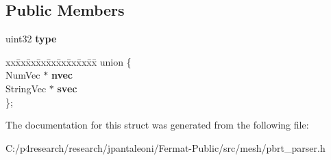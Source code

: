 \subsection*{Public Members}
\begin{DoxyCompactItemize}
\item 
\mbox{\label{structpbrt_1_1_value_a2de3a97f80c479e31993d4dcb1377626}} 
uint32 {\bfseries type}
\item 
\mbox{\label{structpbrt_1_1_value_ab3dc6cf58a952dce1cffb107c12a0e32}} 
\begin{tabbing}
xx\=xx\=xx\=xx\=xx\=xx\=xx\=xx\=xx\=\kill
union \{\\
\>NumVec $\ast$ {\bfseries nvec}\\
\>StringVec $\ast$ {\bfseries svec}\\
\}; \\

\end{tabbing}\end{DoxyCompactItemize}


The documentation for this struct was generated from the following file\+:\begin{DoxyCompactItemize}
\item 
C\+:/p4research/research/jpantaleoni/\+Fermat-\/\+Public/src/mesh/pbrt\+\_\+parser.\+h\end{DoxyCompactItemize}
